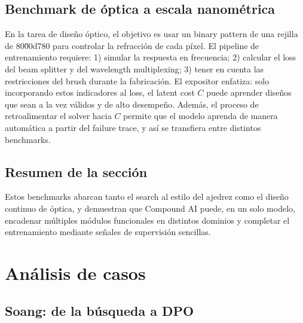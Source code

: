 \documentclass[a4paper]{article}
\begin{document}
\subsection{Benchmark de óptica a escala nanométrica}

En la tarea de diseño óptico, el objetivo es usar un binary pattern de una rejilla de 80\u00d780 para controlar la refracción de cada píxel. El pipeline de entrenamiento requiere: 1) simular la respuesta en frecuencia; 2) calcular el loss del beam splitter y del wavelength multiplexing; 3) tener en cuenta las restricciones del brush durante la fabricación.
El expositor enfatiza: solo incorporando estos indicadores al loss, el latent cost \(C\) puede aprender diseños que sean a la vez válidos y de alto desempeño. Además, el proceso de retroalimentar el solver hacia \(C\) permite que el modelo aprenda de manera automática a partir del failure trace, y así se transfiera entre distintos benchmarks.

\subsection{Resumen de la sección}

Estos benchmarks abarcan tanto el search al estilo del ajedrez como el diseño continuo de óptica, y demuestran que Compound AI puede, en un solo modelo, encadenar múltiples módulos funcionales en distintos dominios y completar el entrenamiento mediante señales de supervisión sencillas.

\section{Análisis de casos}

\subsection{Soang: de la búsqueda a DPO}
\end{document}
